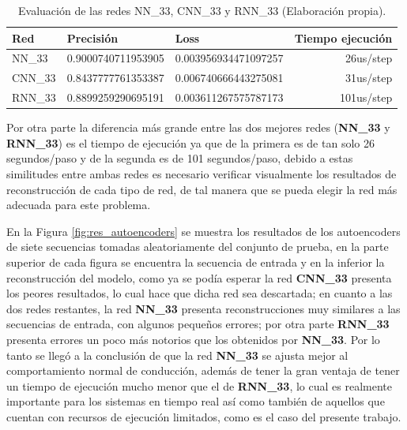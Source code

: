 \begin{table}[H]
\centering
\begin{center}
\begin{tabular}{|l|r|r|r|}
\hline
\textbf{Red} & \multicolumn{1}{l|}{\textbf{Precisi\'{o}n}} & \multicolumn{1}{l|}{\textbf{Loss}} & \multicolumn{1}{l|}{\textbf{Tiempo ejecuci\'{o}n}} \\ \hline
NN\_33              & 0.9000740711953905  & 0.003956934471097257  & 26us/step  \\ \hline
CNN\_33             & 0.8437777761353387  & 0.006740666443275081  & 31us/step  \\ \hline
RNN\_33             & 0.8899259290695191  & 0.003611267575787173  & 101us/step \\ \hline
\end{tabular}
\end{center}
\caption{Evaluaci\'{o}n de las redes NN\_33, CNN\_33 y RNN\_33  (Elaboraci\'{o}n propia).}
\label{table:evaluacion_redes}
\end{table}

Por otra parte la diferencia m\'{a}s grande entre las dos mejores redes (\textbf{NN\_33} y \textbf{RNN\_33}) es el tiempo de ejecuci\'{o}n ya que de la primera es de tan solo 26 segundos/paso y de la segunda es de 101 segundos/paso, debido a estas similitudes entre ambas redes es necesario verificar visualmente los resultados de reconstrucci\'{o}n de cada tipo de red, de tal manera que se pueda elegir la red m\'{a}s adecuada para este problema. 

\vspace{5mm} %

En la Figura \ref{fig:res_autoencoders} se muestra los resultados de los autoencoders de siete secuencias tomadas aleatoriamente del conjunto de prueba, en la parte superior de cada figura se encuentra la secuencia de entrada y en la inferior la reconstrucci\'{o}n del modelo, como ya se pod\'{i}a esperar la red \textbf{CNN\_33} presenta los peores resultados, lo cual hace que dicha red sea descartada; en cuanto a las dos redes restantes, la red \textbf{NN\_33} presenta reconstrucciones muy similares a las secuencias de entrada, con algunos peque\~{n}os errores; por otra parte \textbf{RNN\_33} presenta errores un poco m\'{a}s notorios que los obtenidos por  \textbf{NN\_33}. Por lo tanto se lleg\'{o} a la conclusi\'{o}n de que la red \textbf{NN\_33} se ajusta mejor al comportamiento normal de conducci\'{o}n, adem\'{a}s de tener la gran ventaja de tener un tiempo de ejecuci\'{o}n mucho menor que el de \textbf{RNN\_33}, lo cual es realmente importante para los sistemas en tiempo real as\'{i} como tambi\'{e}n de aquellos que cuentan con recursos de ejecuci\'{o}n limitados, como es el caso del presente trabajo.


